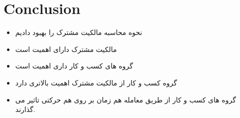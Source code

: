\documentclass[12pt, a4paper]{article}
\begin{document}
\section{Conclusion}
\begin{itemize}
	\item 
	نحوه محاسبه مالکیت مشترک را بهبود دادیم
	\item 
	مالکیت مشترک دارای اهمیت است 
	\item 
	گروه های کسب و کار داری اهمیت است
	\item 
	گروه کسب و کار از مالکیت مشترک اهمیت بالاتری دارد
	\item 
	گروه های کسب و کار از طریق معامله هم زمان بر روی هم حرکتی تاثیر می گذارند.
	
	
\end{itemize}


\newpage
\begin{LTR}

\footnotesize{
	
	
}
\end{LTR}
\end{document}
